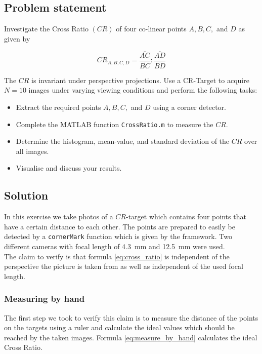 \documentclass[
a4paper,     %
11pt         %
]{scrartcl}  %
\begin{document}
\subsection{Problem statement}

Investigate the Cross Ratio $(CR)$ of four co-linear points $A, B, C,$ and $D$ as given by

\begin{equation}
 CR_{A,B,C,D} = \frac{\overline{AC}}{\overline{BC}} : \frac{\overline{AD}}{\overline{BD}}
 \label{eq:cross_ratio}
\end{equation}

The $CR$ is invariant under perspective projections. Use a CR-Target to acquire $N = 10$ images under varying
viewing conditions and perform the following tasks:

\begin{itemize}
 \item Extract the required points $A, B, C,$ and $D$ using a corner detector.
 \item Complete the MATLAB function \texttt{CrossRatio.m} to measure the $CR$.
 \item Determine the histogram, mean-value, and standard deviation of the $CR$ over all images.
 \item Visualise and discuss your results.
\end{itemize}


\subsection{Solution}

In this exercise we take photos of a $CR$-target which contains four points that have a certain distance to each other.
The points are prepared to easily be detected by a \lstinline{cornerMark} function which is given by the framework.
Two different cameras with focal length of \SI{4.3}{mm} and \SI{12.5}{mm} were used.
\\
The claim to verify is that formula \ref{eq:cross_ratio} is independent of the perspective the picture is taken from as well as independent of the used focal length.

\subsubsection{Measuring by hand}

The first step we took to verify this claim is to measure the distance of the points on the targets using a ruler and calculate the ideal values which should be reached by the taken images.
Formula \ref{eq:measure_by_hand} calculates the ideal Cross Ratio.
\end{document}
